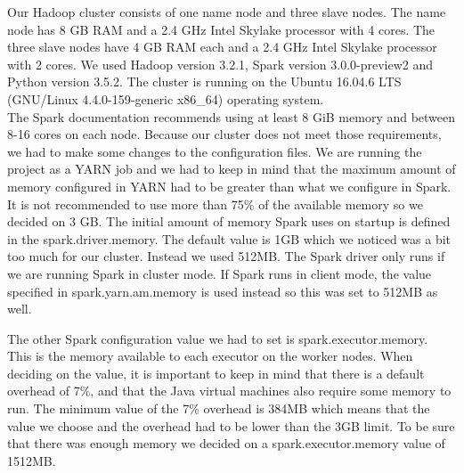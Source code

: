 Our Hadoop cluster consists of one name node and three slave nodes.
The name node has 8 GB RAM and a 2.4 GHz Intel Skylake processor with 4 cores.
The three slave nodes have 4 GB RAM each and a 2.4 GHz Intel Skylake processor with 2 cores.
We used Hadoop version 3.2.1, Spark version 3.0.0-preview2 and Python version 3.5.2. The cluster is running on the Ubuntu 16.04.6 LTS (GNU/Linux 4.4.0-159-generic x86\_64) operating system.
\\
The Spark documentation recommends using at least 8 GiB memory and between 8-16 cores on each node\cite{SparkHardware}. Because our cluster does not meet those requirements, we had to make some changes to the configuration files. We are running the project as a YARN job and we had to keep in mind that the maximum amount of memory configured in YARN had to be greater than what we configure in Spark. It is not recommended to use more than 75\% of the available memory so we decided on 3 GB. The initial amount of memory Spark uses on startup is defined in the spark.driver.memory. The default value is 1GB which we noticed was a bit too much for our cluster. Instead we used 512MB. The Spark driver only runs if we are running Spark in cluster mode. If Spark runs in client mode, the value specified in spark.yarn.am.memory is used instead so this was set to 512MB as well. 

The other Spark configuration value we had to set is spark.executor.memory. This is the memory available to each executor on the worker nodes. When deciding on the value, it is important to keep in mind that there is a default overhead of 7\%, and that the Java virtual machines also require some memory to run. The minimum value of the 7\% overhead is 384MB\cite{SparkOverhead} which means that the value we choose and the overhead had to be lower than the 3GB limit. To be sure that there was enough memory we decided on a spark.executor.memory value of 1512MB.